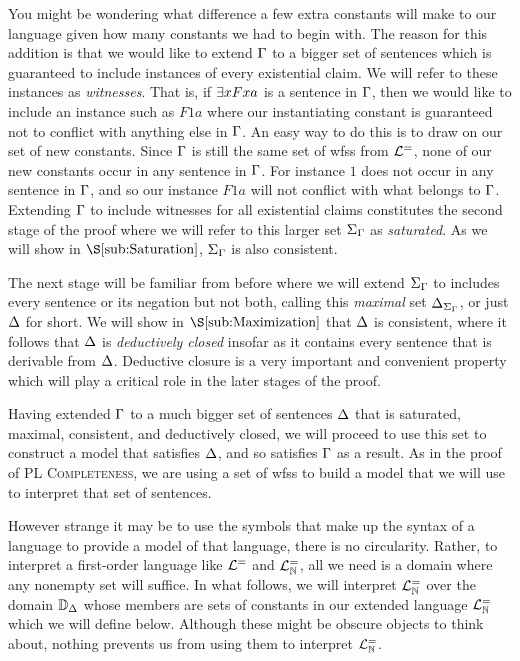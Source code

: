 You might be wondering what difference a few extra constants will make to our language given how many constants we had to begin with.
The reason for this addition is that we would like to extend $\Gamma$ to a bigger set of sentences which is guaranteed to include instances of every existential claim. 
We will refer to these instances as \textit{witnesses}.
That is, if $\exists xFxa$ is a sentence in $\Gamma$, then we would like to include an instance such as $F1a$ where our instantiating constant is guaranteed not to conflict with anything else in $\Gamma$.
An easy way to do this is to draw on our set of new constants.
Since $\Gamma$ is still the same set of wfss from $\mathcal{L}^{=}$, none of our new constants occur in any sentence in $\Gamma$.
For instance $1$ does not occur in any sentence in $\Gamma$, and so our instance $F1a$ will not conflict with what belongs to $\Gamma$. 
Extending $\Gamma$ to include witnesses for all existential claims constitutes the second stage of the proof where we will refer to this larger set $\Sigma_{\Gamma}$ as \textit{saturated}. 
As we will show in $\S\ref{sub:Saturation}$, $\Sigma_{\Gamma}$ is also consistent. 

The next stage will be familiar from before where we will extend $\Sigma_{\Gamma}$ to includes every sentence or its negation but not both, calling this \textit{maximal} set $\Delta_{\Sigma_{\Gamma}}$, or just $\Delta$ for short. 
We will show in $\S\ref{sub:Maximization}$ that $\Delta$ is consistent, where it follows that $\Delta$ is \textit{deductively closed} insofar as it contains every sentence that is derivable from $\Delta$.
Deductive closure is a very important and convenient property which will play a critical role in the later stages of the proof.

Having extended $\Gamma$ to a much bigger set of sentences $\Delta$ that is saturated, maximal, consistent, and deductively closed, we will proceed to use this set to construct a model that satisfies $\Delta$, and so satisfies $\Gamma$ as a result. 
As in the proof of \textsc{PL Completeness}, we are using a set of wfss to build a model that we will use to interpret that set of sentences.

However strange it may be to use the symbols that make up the syntax of a language to provide a model of that language, there is no circularity.
Rather, to interpret a first-order language like $\mathcal{L}^{=}$ and $\mathcal{L}^{=}_{\mathbb{N}}$, all we need is a domain where any nonempty set will suffice.
In what follows, we will interpret $\mathcal{L}^{=}_{\mathbb{N}}$ over the domain $\mathbb{D}_{\Delta}$ whose members are sets of constants in our extended language $\mathcal{L}^{=}_{\mathbb{N}}$ which we will define below.
Although these might be obscure objects to think about, nothing prevents us from using them to interpret $\mathcal{L}^{=}_{\mathbb{N}}$.

